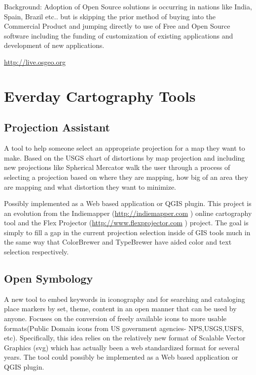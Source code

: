 \documentclass[12pt,letterpaper]{article}
\begin{document}
Background: Adoption of Open Source solutions is occurring in nations like India, Spain, Brazil etc.. but is skipping the prior method of buying into the Commercial Product and jumping directly to use of Free and Open Source software including the funding of customization of existing applications and development of new applications.

\url{http://live.osgeo.org}


\section{Everday Cartography Tools}

\subsection{Projection Assistant}
A tool to help someone select an appropriate projection for a map they want to make. Based on the USGS chart of distortions by map projection and including new projections like Spherical Mercator walk the user through a process of selecting a projection based on where they are mapping, how big of an area they are mapping and what distortion they want to minimize.

Possibly implemented as a Web based application or QGIS plugin. This project is an evolution from the Indiemapper (\url{http://indiemapper.com} ) online cartography tool and the Flex Projector (\url{http://www.flexprojector.com} ) project. The goal is simply to fill a gap in the current projection selection inside of GIS tools much in the same way that ColorBrewer and TypeBrewer have aided color and text selection respectively. 


\subsection{Open Symbology}
A new tool to embed keywords in iconography and for searching and cataloging place markers by set, theme, content in an open manner that can be used by anyone. Focuses on the conversion of freely available icons to more usable formats(Public Domain icons from US government agencies- NPS,USGS,USFS, etc). Specifically, this idea relies on the relatively new format of Scalable Vector Graphics (svg) which has actually been a web standardized format for several years. The tool could possibly be implemented as a Web based application or QGIS plugin.
\end{document}

